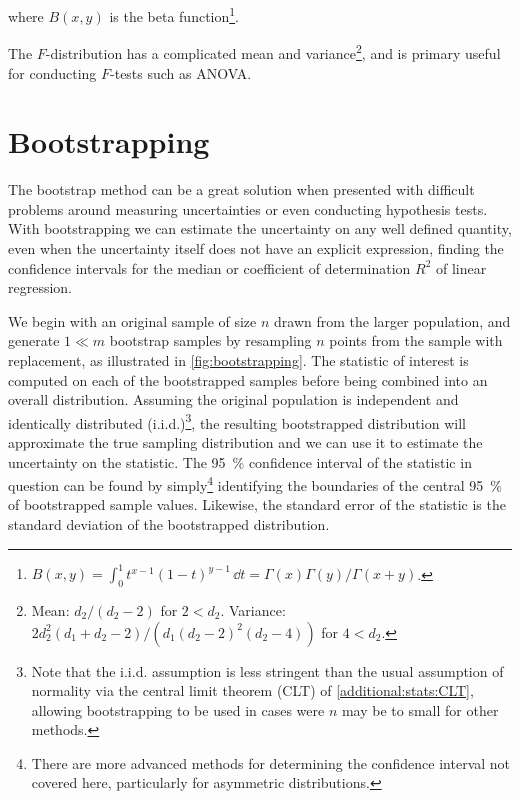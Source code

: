 \noindent where $B\left(x,y\right)$ is the beta function\footnote{$B\left(x,y\right) = \int_{0}^{1} t^{x-1} \left(1-t\right)^{y-1} \, \dd{t} = \Gamma\left(x\right)\Gamma\left(y\right) / \Gamma\left(x+y\right)$.}.

The $F$-distribution has a complicated
mean and variance\footnote{Mean: $d_{2}/\left(d_{2}-2\right)$ for $2 < d_{2}$.
Variance: $2 d_{2}^{2}\left(d_{1}+d_{2}-2\right)/\left(d_{1}\left(d_{2}-2\right)^{2}\left(d_{2}-4\right)\right)$ for $4 < d_{2}$.},
and is primary useful for conducting $F$-tests such as ANOVA.

\section{Bootstrapping}
\label{stats:bootstrapping}

The bootstrap method can be a great solution when presented with difficult problems
around measuring uncertainties or even conducting hypothesis tests.
With bootstrapping we can estimate the uncertainty on any well defined quantity,
even when the uncertainty itself does not have an explicit expression,
\eg finding the confidence intervals for the median
or coefficient of determination $R^{2}$ of linear regression.

We begin with an original sample of size $n$ drawn from the larger population,
and generate $1 \ll m$ bootstrap samples by resampling $n$ points from the sample with replacement,
as illustrated in \cref{fig:bootstrapping}.
The statistic of interest is computed on each of the bootstrapped samples
before being combined into an overall distribution.
Assuming the original population is independent and identically distributed (i.i.d.)\footnote{Note
that the i.i.d. assumption is less stringent than
the usual assumption of normality via the central limit theorem (CLT) of \cref{additional:stats:CLT},
allowing bootstrapping to be used in cases were $n$ may be to small for other methods.},
the resulting bootstrapped distribution will approximate the true sampling distribution
and we can use it to estimate the uncertainty on the statistic.
The \SI{95}{\percent} confidence interval of the statistic in question
can be found by simply\footnote{There are
more advanced methods for determining the confidence interval not covered here,
particularly for asymmetric distributions.} identifying
the boundaries of the central \SI{95}{\percent} of bootstrapped sample values.
Likewise, the standard error of the statistic is the standard deviation of the bootstrapped distribution.

